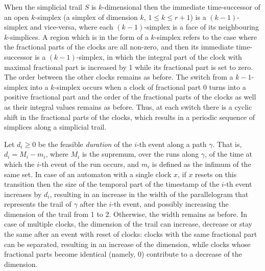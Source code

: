 \documentclass[11pt]{amsart}
\theoremstyle{definition}
\begin{document}
When the simplicial trail $S$ is $k$-dimensional then the immediate time-successor of an open $k$-simplex (a simplex of dimension $k$, $1 \leq k \leq r+1$) is a $(k-1)$-simplex and vice-versa, where each $(k-1)$-simplex is a face of its neighbouring $k$-simplices.
A region which is in the form of a $k$-simplex refers to the case where the fractional parts of the clocks are all non-zero, and then its immediate time-successor is a $(k-1)$-simplex, in which the integral part of the clock with maximal fractional part is increased by 1 while its fractional part is set to zero. The order between the other clocks remains as before.
The switch from a $k-1$-simplex into a $k$-simplex occurs when a clock of fractional part 0 turns into a positive fractional part and the order of the fractional parts of the clocks as well as their integral values remains as before.  
Thus, at each switch there is a cyclic shift in the fractional parts of the clocks, which results in a periodic sequence of simplices along a simplicial trail.

Let $ d_i \geq 0$ be the feasible \emph{duration} of the $i$-th event along a path $\gamma$.
That is, $d_i = M_i - m_i$, where $M_i$ is the supremum, over the runs along $\gamma$, of the time at which the $i$-th event of the run occurs, and $m_i$ is defined as the infimum of the same set.
In case of an automaton with a single clock $x$, if $x$ resets on this transition then the size of the temporal part of the timestamp of the $i$-th event increases by $d_i$, resulting in an increase in the width of the parallelogram that represents the trail of $\gamma$ after the $i$-th event, and possibly increasing the dimension of the trail from 1 to 2.
Otherwise, the width remains as before.
In case of multiple clocks, the dimension of the trail can increase, decrease or stay the same after an event with reset of clocks: clocks with the same fractional part can be separated, resulting in an increase of the dimension, while clocks whose fractional parts become identical (namely, $0$) contribute to a decrease of the dimension.
\end{document}
